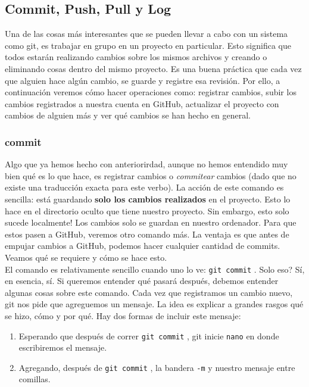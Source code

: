 \documentclass[10pt,letterpaper]{article}
\newcommand{\inlinecode}[1]{
\colorbox{light-gray}{\texttt{#1}}
}
\begin{document}
\subsection{Commit, Push, Pull y Log}
Una de las cosas m\'as interesantes que se pueden llevar a cabo con un sistema como git, es trabajar en grupo en un proyecto en particular. Esto significa que todos estar\'an realizando cambios sobre los mismos archivos y creando o eliminando cosas dentro del mismo proyecto. Es una buena pr\'actica que cada vez que alguien hace alg\'un cambio, se guarde y registre esa revisi\'on. Por ello, a continuaci\'on veremos c\'omo hacer operaciones como: registrar cambios, subir los cambios registrados a nuestra cuenta en GitHub, actualizar el proyecto con cambios de alguien m\'as y ver qu\'e cambios se han hecho en general.

\subsubsection{commit}
Algo que ya hemos hecho con anteriorirdad, aunque no hemos entendido muy bien qu\'e es lo que hace, es registrar cambios o \emph{commitear} cambios (dado que no existe una traducci\'on exacta para este verbo). La acci\'on de este comando es sencilla: est\'a guardando \textbf{solo los cambios realizados} en el proyecto. Esto lo hace en el directorio oculto que tiene nuestro proyecto. Sin embargo, esto solo sucede localmente! Los cambios solo se guardan en nuestro ordenador. Para que estos pasen a GitHub, veremos otro comando m\'as. La ventaja es que antes de empujar cambios a GitHub, podemos hacer cualquier cantidad de commits. Veamos qu\'e se requiere y c\'omo se hace esto.\\

El comando es relativamente sencillo cuando uno lo ve: \inlinecode{git commit}. Solo eso? S\'i, en esencia, s\'i. Si queremos entender qu\'e pasar\'a despu\'es, debemos entender algunas cosas sobre este comando. Cada vez que registramos un cambio nuevo, git nos pide que agreguemos un mensaje. La idea es explicar a grandes rasgos qu\'e se hizo, c\'omo y por qu\'e. Hay dos formas de incluir este mensaje:
\begin{enumerate}
\item Esperando que despu\'es de correr \inlinecode{git commit}, git inicie \inlinecode{nano} en donde escribiremos el mensaje.
\item Agregando, despu\'es de \inlinecode{git commit}, la bandera \inlinecode{-m} y nuestro mensaje entre comillas.
\end{enumerate}
\end{document}
